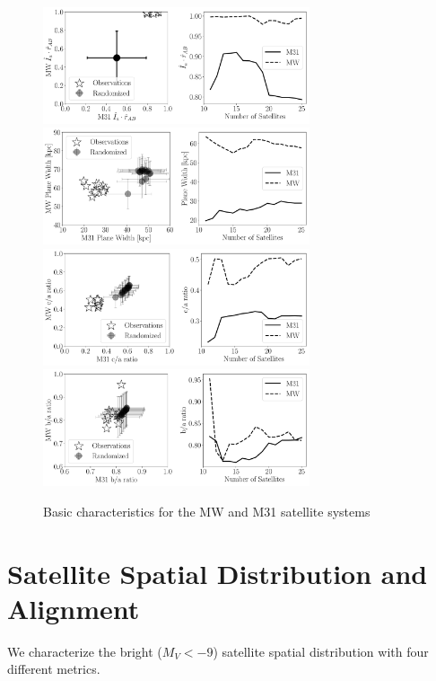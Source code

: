\documentclass[a4paper,fleqn,usenatbib]{mnras}
\begin{document}
\begin{figure}
\centering
\includegraphics[width=0.7\textwidth]{mu_lg.pdf}
\includegraphics[width=0.7\textwidth]{planewidth_lg.pdf}
\includegraphics[width=0.7\textwidth]{ca_ratio_lg.pdf}
\includegraphics[width=0.7\textwidth]{ba_ratio_lg.pdf}
\caption{Basic characteristics for the MW and M31 satellite systems
\label{fig:general}}
\end{figure}




\section{Satellite Spatial Distribution and Alignment}
\label{sec:SpatialMeasurements}

We characterize the bright ($M_V<-9$) satellite spatial distribution
with four different metrics. 
\end{document}

